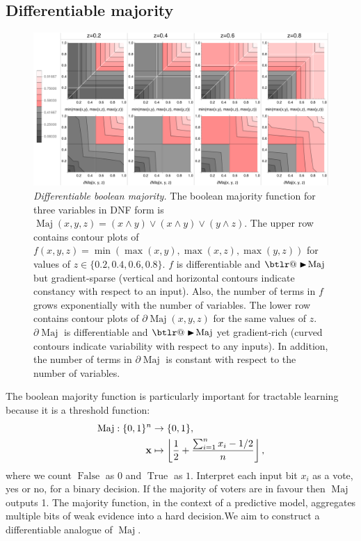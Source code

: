 \documentclass{article} %
\makeatletter
\DeclareRobustCommand{\btright}{\mathrel{\mathpalette\btlr@\blacktriangleright}}
\newcommand{\btlr@}[2]{%
	\begingroup
	\sbox\z@{$\m@th#1\triangleright$}%
	\sbox\tw@{\resizebox{1.1\wd\z@}{1.1\ht\z@}{\raisebox{\depth}{$\m@th#1\mkern-1mu#2$}}}%
	\ht\tw@=\ht\z@ \dp\tw@=\dp\z@ \wd\tw@=\wd\z@
	\copy\tw@
	\endgroup
}
\makeatother
\begin{document}
\subsection{Differentiable majority}

\begin{figure}[t]
	\centering
	\includegraphics[trim=0pt 0pt 0pt 0pt, clip, width=1.0\textwidth]{majority-gates.png}
	\caption{{\em Differentiable boolean majority.} The boolean majority function for three variables in DNF form is $\operatorname{Maj}(x,y,z) = (x \wedge y) \vee (x \wedge y) \vee (y \wedge z)$. The upper row contains contour plots of $f(x,y,z) = \operatorname{min}(\operatorname{max}(x,y), \operatorname{max}(x,z), \operatorname{max}(y,z))$ for values of $z \in \{0.2, 0.4, 0.6, 0.8\}$. $f$ is differentiable and $\btright\!\operatorname{Maj}$ but gradient-sparse (vertical and horizontal contours indicate constancy with respect to an input). Also, the number of terms in $f$ grows exponentially with the number of variables. The lower row contains contour plots of $\partial\!\operatorname{Maj}(x,y,z)$ for the same values of $z$. $\partial\!\operatorname{Maj}$ is differentiable and $\btright\!\operatorname{Maj}$ yet gradient-rich (curved contours indicate variability with respect to any inputs). In addition, the number of terms in $\partial\!\operatorname{Maj}$ is constant with respect to the number of variables.} 
	\label{fig:majority-plot}
\end{figure}

The boolean majority function is particularly important for tractable learning because it is a threshold function:
\begin{equation*}
\begin{aligned}
\operatorname{Maj}: \{0,1\}^{n} &\to \{0,1\},\\
{\bf x} &\mapsto \left\lfloor
\frac{1}{2} + \frac{\sum_{i=1}^{n} x_{i} - 1/2}{n}
\right\rfloor\text{,}
\end{aligned}
\end{equation*}
where we count $\operatorname{False}$ as $0$ and $\operatorname{True}$ as $1$. Interpret each input bit $x_{i}$ as a vote, yes or no, for a binary decision. If the majority of voters are in favour then $\operatorname{Maj}$ outputs 1. The majority function, in the context of a predictive model, aggregates multiple bits of weak evidence into a hard decision.We aim to construct a differentiable analogue of $\operatorname{Maj}$.
\end{document}

